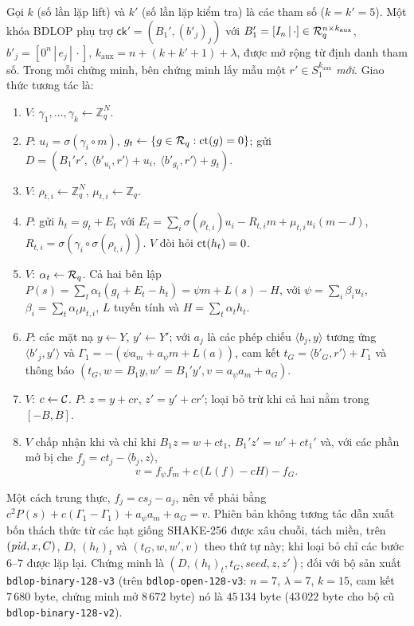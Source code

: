 Gọi $k$ (số lần lặp lift) và $k'$ (số lần lặp kiểm tra) là các tham số
($k=k'=5$). Một khóa BDLOP phụ trợ $\mathsf{ck}'=(B_1',(b'_j)_j)$ với
$B_1'=[I_n\,|\,\cdot]\in\mathcal{R}_q^{n\times k_{\mathrm{aux}}}$,
$b'_j=[0^n\,|\,e_j\,|\,\cdot]$, $k_{\mathrm{aux}}=n+(k+k'+1)+\lambda$, được
mở rộng từ định danh tham số. Trong mỗi chứng minh, bên chứng minh lấy mẫu một
$r'\in S_1^{k_{\mathrm{aux}}}$ \emph{mới}. Giao thức tương tác là:
\begin{enumerate}
\item $V$: $\gamma_1,\dots,\gamma_k\leftarrow\mathbb Z_q^N$.
\item $P$: $u_i=\sigma(\gamma_i\circ m)$, $g_t\leftarrow\{g\in\mathcal{R}_q:\mathrm{ct}(g)=0\}$;
  gửi $D=(B_1'r',\ \langle b'_{u_i},r'\rangle+u_i,\ \langle b'_{g_t},r'\rangle+g_t)$.
\item $V$: $\rho_{t,i}\leftarrow\mathbb Z_q^N$, $\mu_{t,i}\leftarrow\mathbb Z_q$.
\item $P$: gửi $h_t=g_t+E_t$ với
  $E_t=\sum_i\sigma(\rho_{t,i})u_i-R_{t,i}m+\mu_{t,i}u_i(m-J)$,
  $R_{t,i}=\sigma(\gamma_i\circ\sigma(\rho_{t,i}))$. $V$ đòi hỏi $\mathrm{ct}(h_t)=0$.
\item $V$: $\alpha_t\leftarrow\mathcal{R}_q$. Cả hai bên lập
  $P(s)=\sum_t\alpha_t(g_t+E_t-h_t)=\psi m+L(s)-H$, với
  $\psi=\sum_i\beta_iu_i$, $\beta_i=\sum_t\alpha_t\mu_{t,i}$, $L$ tuyến tính và
  $H=\sum_t\alpha_th_t$.
\item $P$: các mặt nạ $y\leftarrow Y$, $y'\leftarrow Y'$; với $a_j$ là các phép
  chiếu $\langle b_j,y\rangle$ tương ứng $\langle b'_j,y'\rangle$ và
  $\Gamma_1=-(\psi a_m+a_\psi m+L(a))$, cam kết $t_G=\langle b'_G,r'\rangle+\Gamma_1$
  và thông báo $(t_G,w=B_1y,w'=B_1'y',v=a_\psi a_m+a_G)$.
\item $V$: $c\leftarrow\mathcal{C}$.\quad
  $P$: $z=y+cr$, $z'=y'+cr'$; loại bỏ trừ khi cả hai nằm trong $[-B,B]$.
\item $V$ chấp nhận khi và chỉ khi $B_1z=w+ct_1$, $B_1'z'=w'+ct_1'$ và, với các
  phần mở bị che $f_j=ct_j-\langle b_j,z\rangle$,
  \[
  v=f_\psi f_m+c\,\bigl(L(f)-cH\bigr)-f_G .
  \]
\end{enumerate}
Một cách trung thực, $f_j=cs_j-a_j$, nên vế phải bằng
$c^2P(s)+c(\Gamma_1-\Gamma_1)+a_\psi a_m+a_G=v$. Phiên bản không tương tác dẫn
xuất bốn thách thức từ các hạt giống SHAKE-256 được xâu chuỗi, tách miền, trên
$(\mathit{pid},x,C)$, $D$, $(h_t)_t$ và $(t_G,w,w',v)$ theo thứ tự này; khi loại bỏ chỉ
các bước 6--7 được lặp lại. Chứng minh là
$(D,(h_t)_t,t_G,\mathit{seed},z,z')$; đối với bộ sản xuất
\texttt{bdlop-binary-128-v3} (trên \texttt{bdlop-open-128-v3}: $n=7$,
$\lambda=7$, $k=15$, cam kết $7\,680$ byte, chứng minh mở $8\,672$ byte) nó là
$45\,134$ byte ($43\,022$ byte cho bộ cũ \texttt{bdlop-binary-128-v2}).

